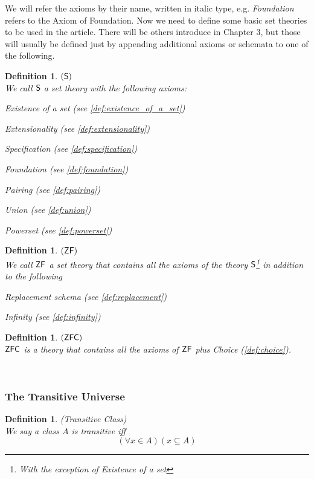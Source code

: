 \documentclass[12pt,a4paper]{article}
\newtheorem{definition}[theorem]{Definition}
\newcommand{\bce}{\begin{compactenum}}
\newcommand{\ece}{\end{compactenum}}
\begin{document}
We will refer the axioms by their name, written in italic type, e.g. \emph{Foundation} refers to the Axiom of Foundation. Now we need to define some basic set theories to be used in the article. There will be others introduce in Chapter 3, but those will usually be defined just by appending additional axioms or schemata to one of the following.

\begin{definition}{$(\sf{S})$}\label{def:s}\\
We call $\sf{S}$ a set theory with the following axioms:
\bce[(i)]
\item \emph{Existence of a set} (see \ref{def:existence_of_a_set})
\item \emph{Extensionality} (see \ref{def:extensionality})
\item \emph{Specification} (see \ref{def:specification})
\item \emph{Foundation} (see \ref{def:foundation})
\item \emph{Pairing} (see \ref{def:pairing})
\item \emph{Union} (see \ref{def:union})
\item \emph{Powerset} (see \ref{def:powerset})
\ece
\end{definition}

\begin{definition}{$(\sf{ZF})$}\label{def:zf}\\
We call $\sf{ZF}$ a set theory that contains all the axioms of the theory $\sf{S}$\footnote{With the exception of \emph{Existence of a set}} in addition to the following
\bce[(i)]
\item \emph{Replacement} schema (see \ref{def:replacement})
\item \emph{Infinity} (see \ref{def:infinity})
\ece
\end{definition}

\begin{definition}{$(\sf{ZFC})$}\label{def:zfc}\\
$\sf{ZFC}$ is a theory that contains all the axioms of $\sf{ZF}$ plus \emph{Choice} (\ref{def:choice}).
\end{definition}

\

\subsubsection{The Transitive Universe}
\begin{definition}{(Transitive Class)}\label{def:transitivity}\\
We say a class $A$ is \emph{transitive} iff
\begin{equation}
(\forall x \in A)(x \subseteq A)
\end{equation}
\end{definition}
\end{document}
